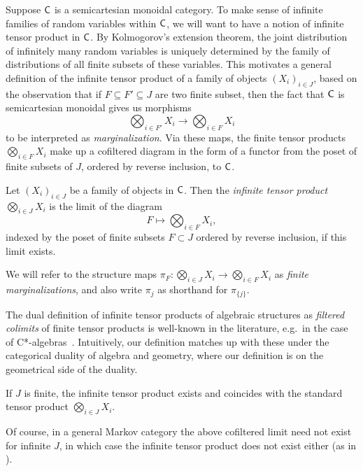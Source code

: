 \documentclass[11pt]{article}
\begin{document}
Suppose $\mathsf{C}$ is a semicartesian monoidal category.
To make sense of infinite families of random variables within $\mathsf{C}$,
we will want to have a notion of infinite tensor product in $\mathsf{C}$. By Kolmogorov's extension theorem, the joint distribution of infinitely many random variables is uniquely determined by the family of distributions of all finite subsets of these variables. This motivates a general definition of the infinite tensor product of a family of objects $(X_i)_{i \in J}$, based on the observation that if $F \subseteq F' \subseteq J$ are two finite subset, then the fact that $\mathsf{C}$ is semicartesian monoidal gives us morphisms
\[
	\bigotimes_{i \in F'} X_i \longrightarrow \bigotimes_{i \in F} X_i
\]
to be interpreted as \emph{marginalization}. Via these maps, the finite tensor products $\bigotimes_{i \in F} X_i$ make up a cofiltered diagram in the form of a functor from the poset of finite subsets of $J$, ordered by reverse inclusion, to $\mathsf{C}$.

\begin{definition}
    Let $(X_i)_{i \in J}$ be a family of objects in $\mathsf{C}$.
    Then the \emph{infinite tensor product} $\bigotimes_{i \in J} X_i$ is the limit of the diagram \[F \longmapsto \bigotimes_{i \in F} X_i,\]
    indexed by the poset of finite subsets $F \subset J$ ordered by reverse inclusion, if this limit exists.
\end{definition}

We will refer to the structure maps $\pi_F : \bigotimes_{i\in J} X_i \to \bigotimes_{i\in F} X_i$ as \emph{finite marginalizations}, and also write $\pi_j$ as shorthand for $\pi_{\{j\}}$.

The dual definition of infinite tensor products of algebraic structures as \emph{filtered colimits} of finite tensor products is well-known in the literature, e.g.~in the case of C*-algebras~\cite[p.~315]{blackadar}. Intuitively, our definition matches up with these under the categorical duality of algebra and geometry, where our definition is on the geometrical side of the duality.

\begin{remark}
	If $J$ is finite, the infinite tensor product exists and coincides with the standard tensor product $\bigotimes_{i \in J} X_i$.
\end{remark}

Of course, in a general Markov category the above cofiltered limit need not exist for infinite $J$, in which case the infinite tensor product does not exist either (as in ).
\end{document}
